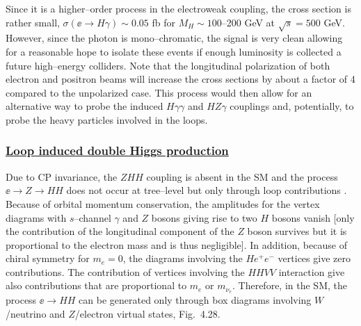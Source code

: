 {Since it is a higher--order process in the electroweak coupling, the cross
section is rather small, $\sigma(\ee \to H\gamma) \sim 0.05$
fb for $M_H \sim100$--200 GeV at $\sqrt{s}=500$ GeV. However, since the photon
is mono--chromatic, the signal is very clean  allowing for a reasonable hope to
isolate these events if enough luminosity is collected a future high--energy
colliders.  Note that the longitudinal polarization of both electron and
positron beams will increase the cross sections by about a factor of 4 compared
to the unpolarized case. This process would then allow  for an alternative way
to probe the induced $H\gamma \gamma$  and $HZ\gamma$ couplings and,
potentially, to probe the heavy particles involved in the loops.  

\vspace*{-2mm}
\subsubsection*{\underline{Loop induced double Higgs production}}

Due to CP invariance, the $ZHH$ coupling is absent in the SM and the  process
$\ee \to Z \to HH$ does not occur  at tree--level but only through  loop
contributions \cite{ee-HHloop}. Because of orbital  momentum conservation, the
amplitudes for the vertex diagrams with $s$--channel $\gamma$ and $Z$ bosons
giving rise to two $H$ bosons vanish [only the  contribution of the
longitudinal component of the $Z$ boson survives but it is proportional to the
electron mass and is thus negligible].  In addition, because of chiral symmetry
for $m_e=0$,  the diagrams  involving the $He^+e^-$ vertices give zero
contributions. The contribution of vertices involving the $HHVV$ interaction
give also contributions that are proportional to $m_e$ or $m_{\nu_e}$.
Therefore, in the SM, the process $\ee \to HH$ can be generated only through
box diagrams involving $W$/neutrino and $Z$/electron virtual states, Fig.~4.28.

}
